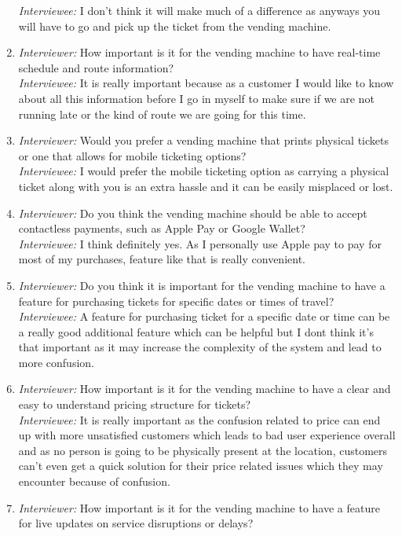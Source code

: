 \begin{enumerate}
\emph{Interviewee:} I don't think it will make much of a difference as anyways you will have to go and pick up the ticket from the vending machine.
    \item \emph{Interviewer:} How important is it for the vending machine to have real-time schedule and route information?\\
\emph{Interviewee:} It is really important because as a customer I would like to know about all this information before I go in myself to make sure if we are not running late or the kind of route we are going for this time.
    \item \emph{Interviewer:} Would you prefer a vending machine that prints physical tickets or one that allows for mobile ticketing options?\\
\emph{Interviewee:} I would prefer the mobile ticketing option as carrying a physical ticket along with you is an extra hassle and it can be easily misplaced or lost.
    \item \emph{Interviewer:} Do you think the vending machine should be able to accept contactless payments, such as Apple Pay or Google Wallet?\\
\emph{Interviewee:} I think definitely yes. As I personally use Apple pay to pay for most of my purchases, feature like that is really convenient. 
    \item \emph{Interviewer:} Do you think it is important for the vending machine to have a feature for purchasing tickets for specific dates or times of travel?\\
\emph{Interviewee:}  A feature for purchasing ticket for a specific date or time can be a really good additional feature which can be helpful but I dont think it’s that important as it may increase the complexity of the system and lead to more confusion.
    \item \emph{Interviewer:} How important is it for the vending machine to have a clear and easy to understand pricing structure for tickets?\\
\emph{Interviewee:} It is really important as the confusion related to price can end up with more unsatisfied customers which leads to bad user experience overall and as no person is going to be physically present at the location, customers can’t even get a quick solution for their price related issues which they may encounter because of confusion.
    \item \emph{Interviewer:} How important is it for the vending machine to have a feature for live updates on service disruptions or delays?\\

\end{enumerate}
